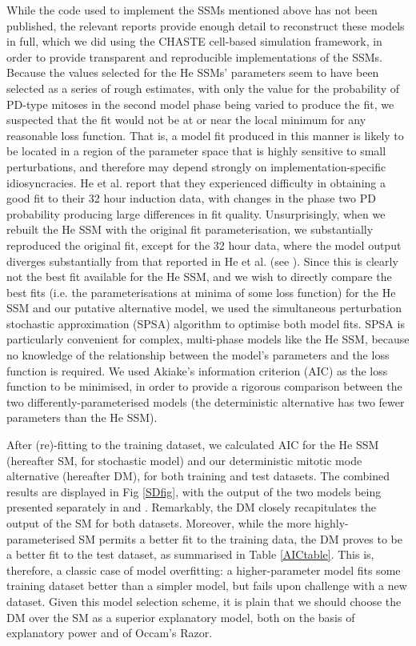 \documentclass[10pt,letterpaper]{article}
\begin{document}
While the code used to implement the SSMs mentioned above has not been published, the relevant reports provide enough detail to reconstruct these models in full, which we did using the CHASTE cell-based simulation framework, in order to provide transparent and reproducible implementations of the SSMs. Because the values selected for the He SSMs' parameters seem to have been selected as a series of rough estimates, with only the value for the probability of PD-type mitoses in the second model phase being varied to produce the fit, we suspected that the fit would not be at or near the local minimum for any reasonable loss function. That is, a model fit produced in this manner is likely to be located in a region of the parameter space that is highly sensitive to small perturbations, and therefore may depend strongly on implementation-specific idiosyncracies. He et al. report that they experienced difficulty in obtaining a good fit to their 32 hour induction data, with changes in the phase two PD probability producing large differences in fit quality. Unsurprisingly, when we rebuilt the He SSM with the original fit parameterisation, we substantially reproduced the original fit, except for the 32 hour data, where the model output diverges substantially from that reported in He et al. (see ). Since this is clearly not the best fit available for the He SSM, and we wish to directly compare the best fits (i.e. the parameterisations at minima of some loss function) for the He SSM and our putative alternative model, we used the simultaneous perturbation stochastic approximation (SPSA) algorithm\cite{Spall1998} to optimise both model fits. SPSA is particularly convenient for complex, multi-phase models like the He SSM, because no knowledge of the relationship between the model's parameters and the loss function is required. We used Akiake's information criterion (AIC) as the loss function to be minimised, in order to provide a rigorous comparison between the two differently-parameterised models (the deterministic alternative has two fewer parameters than the He SSM). 

After (re)-fitting to the training dataset, we calculated AIC for the He SSM (hereafter SM, for stochastic model) and our deterministic mitotic mode alternative (hereafter DM), for both training and test datasets. The combined results are displayed in Fig \ref{SDfig}, with the output of the two models being presented separately in  and . Remarkably, the DM closely recapitulates the output of the SM for both datasets. Moreover, while the more highly-parameterised SM permits a better fit to the training data, the DM proves to be a better fit to the test dataset, as summarised in Table \ref{AICtable}. This is, therefore, a classic case of model overfitting: a higher-parameter model fits some training dataset better than a simpler model, but fails upon challenge with a new dataset. Given this model selection scheme, it is plain that we should choose the DM over the SM as a superior explanatory model, both on the basis of explanatory power and of Occam's Razor.
\end{document}
